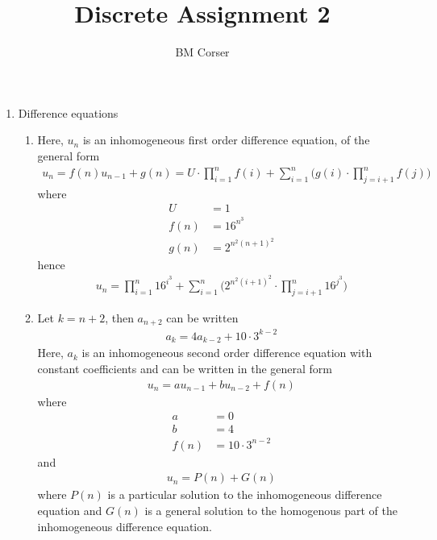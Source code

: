 \documentclass[10pt]{article}
\author{BM Corser}
\title{Discrete Assignment 2}
\begin{document}
    \maketitle 
    \begin{enumerate}
        \item Difference equations
        \begin{enumerate}
            \item Here, $u_n$ is an inhomogeneous first order difference
                equation, of the general form
                \begin{align*}
                    u_n = f(n)u_{n - 1} + g(n)
                        = U \cdot \prod_{i = 1}^n f(i) + \sum_{i = 1}^n\Bigg(g(i) \cdot \prod_{j = i + 1}^n f(j) \Bigg)
                \end{align*}
                where
                \begin{align*}
                    U &= 1 \\
                    f(n) &= 16^{n^3} \\
                    g(n) &= 2^{n^2(n + 1)^2}
                \end{align*}
                hence
                \begin{align*}
                    u_n = \prod_{i = 1}^n 16^{i^3} + \sum_{i = 1}^n\Bigg(2^{n^2(i + 1)^2} \cdot \prod_{j = i + 1}^n 16^{j^3} \Bigg)
                \end{align*}
            \item Let $k = n + 2$, then $a_{n + 2}$ can be written
                \begin{align*}
                    a_k = 4a_{k - 2} + 10 \cdot 3^{k - 2}
                \end{align*}
                Here, $a_k$ is an inhomogeneous second order difference
                equation with constant coefficients and can be written in the
                general form
                \begin{align*}
                    u_n = au_{n - 1} + bu_{n - 2} + f(n)
                \end{align*}
                where 
                \begin{align*}
                    a &= 0 \\
                    b &= 4 \\
                    f(n) &= 10 \cdot 3^{n - 2}
                \end{align*}
                and
                \begin{align*}
                    u_n = P(n) + G(n)
                \end{align*}
                where $P(n)$ is a particular solution to the inhomogeneous
                difference equation and $G(n)$ is a general solution to the
                homogenous part of the inhomogeneous difference equation.


\end{enumerate}
\end{enumerate}
\end{document}
